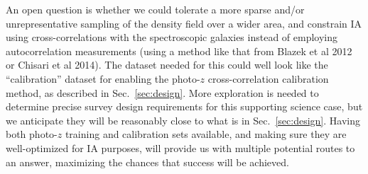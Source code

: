  An open question is whether we could tolerate a more sparse and/or unrepresentative sampling of the density field over a wider area, and constrain IA using cross-correlations with the spectroscopic galaxies instead of employing 
autocorrelation measurements (using a method like that from Blazek et al 2012 or Chisari et al 2014).
The dataset needed for this could well look like  the ``calibration'' dataset for enabling the
photo-$z$ cross-correlation calibration method, as described in Sec.~\ref{sec:design}. More exploration is needed to determine precise survey design requirements for this supporting science case, but we anticipate they will be
reasonably close to what is in Sec.~\ref{sec:design}.  Having both photo-$z$ training and calibration sets available, and making sure they are well-optimized for IA purposes, will provide us with multiple potential routes to an answer, maximizing the chances that success will be achieved.


